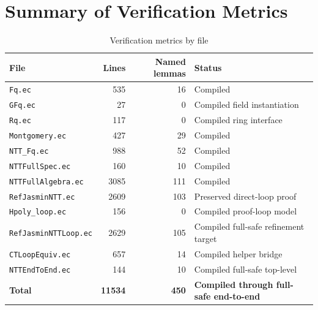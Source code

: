 \section{Summary of Verification Metrics}

\begin{table}[htbp]
\centering
\caption{Verification metrics by file}
\label{tab:metrics}
\small
\begin{tabular}{
  >{\raggedright\arraybackslash}p{}
  rr
  >{\raggedright\arraybackslash}p{}}
\toprule
File & Lines & Named lemmas & Status \\
\midrule
\texttt{Fq.ec}           & 535  & 16  & Compiled \\
\texttt{GFq.ec}          & 27   & 0   & Compiled field instantiation \\
\texttt{Rq.ec}           & 117  & 0   & Compiled ring interface \\
\texttt{Montgomery.ec}   & 427  & 29  & Compiled \\
\texttt{NTT\_Fq.ec}      & 988  & 52  & Compiled \\
\texttt{NTTFullSpec.ec}  & 160  & 10  & Compiled \\
\texttt{NTTFullAlgebra.ec} & 3085 & 111 & Compiled \\
\texttt{RefJasminNTT.ec} & 2609 & 103 & Preserved direct-loop proof \\
\texttt{Hpoly\_loop.ec} & 156 & 0 & Compiled proof-loop model \\
\texttt{RefJasminNTT\allowbreak Loop.ec} & 2629 & 105 & Compiled full-safe refinement target \\
\texttt{CTLoopEquiv.ec} & 657 & 14 & Compiled helper bridge \\
\texttt{NTTEndToEnd.ec}  & 144  & 10  & Compiled full-safe top-level \\
\midrule
\textbf{Total}           & \textbf{11534} & \textbf{450} & \textbf{Compiled through full-safe end-to-end} \\
\bottomrule
\end{tabular}
\normalsize
\end{table}
